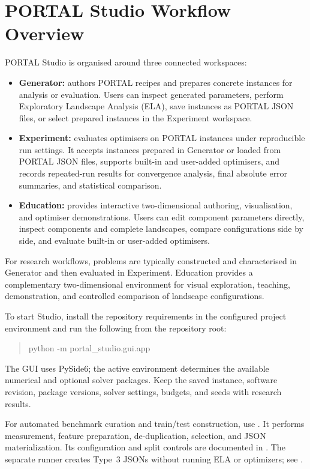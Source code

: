 \documentclass[journal,onecolumn]{IEEEtran}
\begin{document}
\section{PORTAL Studio Workflow Overview}
\label{sec:manual:studio-provides}

PORTAL Studio is organised around three connected workspaces:

\begin{itemize}
\item \textbf{Generator:} authors PORTAL recipes and prepares concrete instances for analysis or evaluation. Users can inspect generated parameters, perform Exploratory Landscape Analysis (ELA), save instances as PORTAL JSON files, or select prepared instances in the Experiment workspace.

\item \textbf{Experiment:} evaluates optimisers on PORTAL instances under reproducible run settings. It accepts instances prepared in Generator or loaded from PORTAL JSON files, supports built-in and user-added optimisers, and records repeated-run results for convergence analysis, final absolute error summaries, and statistical comparison.

\item \textbf{Education:} provides interactive two-dimensional authoring, visualisation, and optimiser demonstrations. Users can edit component parameters directly, inspect components and complete landscapes, compare configurations side by side, and evaluate built-in or user-added optimisers.
\end{itemize}

For research workflows, problems are typically constructed and characterised in Generator and then evaluated in Experiment. Education provides a complementary two-dimensional environment for visual exploration, teaching, demonstration, and controlled comparison of landscape configurations.

To start Studio, install the repository requirements in the configured project environment and run the following from the repository root:
\begin{quote}\ttfamily
python -m portal\_studio.gui.app
\end{quote}
The GUI uses PySide6; the active environment determines the available numerical and optional solver packages. Keep the saved instance, software revision, package versions, solver settings, budgets, and seeds with research results.

For automated benchmark curation and train/test construction, use
. It performs measurement, feature preparation,
de-duplication, selection, and JSON materialization. Its configuration and split
controls are documented in .
The separate  runner creates Type~3 JSONs
without running ELA or optimizers; see
.
\end{document}
